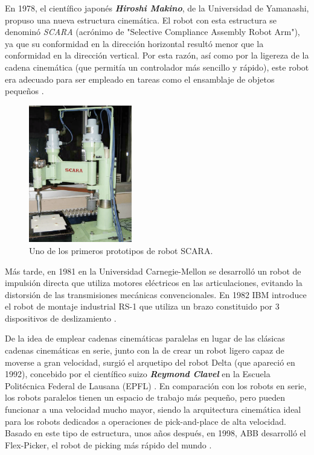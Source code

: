 \begin{itemize}
  En 1978, el científico japonés \textbf{\emph{Hiroshi Makino}}, de la Universidad de Yamanashi, propuso una nueva estructura cinemática. El robot con esta estructura se denominó \emph{SCARA} (acrónimo de "Selective Compliance Assembly Robot Arm"), ya que su conformidad en la dirección horizontal resultó menor que la conformidad en la dirección vertical. Por esta razón, así como por la ligereza de la cadena cinemática (que permitía un controlador más sencillo y rápido), este robot era adecuado para ser empleado en tareas como el ensamblaje de objetos pequeños \cite{Makino80}.
  
  \begin{figure} [h!]
    \begin{center}
      \includegraphics[width=45mm]{figs/Scara.png}
    \end{center}
    \caption{Uno de los primeros prototipos de robot SCARA.}
    \label{fig:Scara}
  \end{figure}
  
  Más tarde, en 1981 en la Universidad Carnegie-Mellon se desarrolló un robot de impulsión directa que utiliza motores eléctricos en las articulaciones, evitando la distorsión de las transmisiones mecánicas convencionales. En 1982 IBM introduce el robot de montaje industrial RS-1 que utiliza un brazo constituido por 3 dispositivos de deslizamiento \cite{Sanchez07b}.
  
  De la idea de emplear cadenas cinemáticas paralelas en lugar de las clásicas cadenas cinemáticas en serie, junto con la de crear un robot ligero capaz de moverse a gran velocidad, surgió el arquetipo del robot Delta (que apareció en 1992), concebido por el científico suizo \textbf{\emph{Reymond Clavel}} en la Escuela Politécnica Federal de Lausana (EPFL) \cite{Clavel91}. En comparación con los robots en serie, los robots paralelos tienen un espacio de trabajo más pequeño, pero pueden funcionar a una velocidad mucho mayor, siendo la arquitectura cinemática ideal para los robots dedicados a operaciones de pick-and-place de alta velocidad. Basado en este tipo de estructura, unos años después, en 1998, ABB desarrolló el Flex-Picker, el robot de picking más rápido del mundo \cite{Gasparetto19}.
  

\end{itemize}
